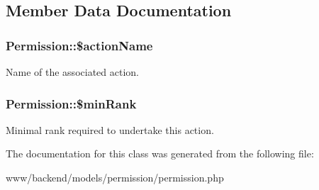 \subsection{Member Data Documentation}
\hypertarget{classPermission_ae5d62bba6b0bf9df502550081ce35db4}{
\subsubsection[{\$actionName}]{\setlength{\rightskip}{0pt plus 5cm}Permission::\$actionName}}
\label{classPermission_ae5d62bba6b0bf9df502550081ce35db4}
Name of the associated action. \hypertarget{classPermission_a21d0591b1aeff82d569b033fad2f521c}{
\subsubsection[{\$minRank}]{\setlength{\rightskip}{0pt plus 5cm}Permission::\$minRank}}
\label{classPermission_a21d0591b1aeff82d569b033fad2f521c}
Minimal rank required to undertake this action. 

The documentation for this class was generated from the following file:\begin{DoxyCompactItemize}
\item 
www/backend/models/permission/permission.php\end{DoxyCompactItemize}
